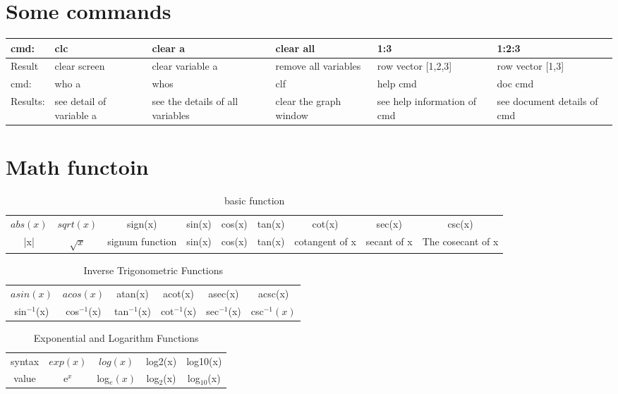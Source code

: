 \documentclass{article}
\begin{document}
\section{Some commands}
  \begin{table}[H]
    \centering
    \begin{tabularx}{\linewidth}{lXXXXX}\toprule
      cmd: & clc & clear a & clear all & 1:3&1:2:3\\\midrule
      Result& clear screen & clear variable a& remove all variables & row vector [1,2,3]& row vector [1,3]\\\midrule
      cmd:& who a & whos &clf&help cmd& doc cmd\\\midrule
      Results: &see detail of variable a& see the details of all variables& clear the graph window& see help information
      of cmd& see document details of cmd\\\bottomrule
    \end{tabularx}
  \end{table}

\section{Math functoin}
\begin{table}
  \centering
  \scriptsize
  \begin{tabularx}{\linewidth}{ccccccccc}\toprule
    $abs(x)$&$sqrt(x)$& sign(x)& sin(x) & cos(x)& tan(x) & cot(x)& sec(x) & csc(x)\\
   
    |x|& $\sqrt{x}$ &signum function& sin(x) & cos(x) & tan(x)& cotangent of x& secant of x& The cosecant of x\\\bottomrule
  \end{tabularx}
  \caption{basic function}
\end{table}

\begin{table}
  \begin{tabularx}{\linewidth}{cccccc}\toprule
    $asin(x)$&$acos(x)$& atan(x) & acot(x)& asec(x) & acsc(x)\\
   
     sin$^{-1}$(x) & cos$^{-1}$(x) & tan$^{-1}$(x)& cot$^{-1}$(x)& sec$^{-1}$(x)&csc$^{-1}(x)$\\\bottomrule
   \end{tabularx}
   \caption{Inverse Trigonometric Functions}
   \end{table}
   \begin{table}
     \centering
   \begin{tabularx}{\linewidth}{ccccc}\toprule
   syntax& $exp(x)$&$log(x)$& log2(x) & log10(x)\\
   
     value&e$^{x}$ & log$_{e}(x)$ & log$_{2}$(x)& log$_{10}$(x)\\\bottomrule
   \end{tabularx}
   \caption{   Exponential and Logarithm Functions}
   \end{table}
 
\end{document}

